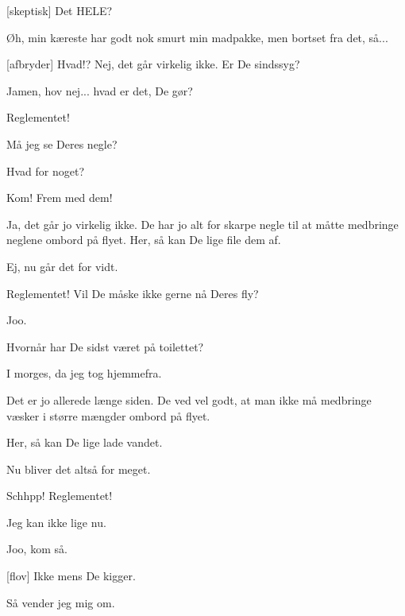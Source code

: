\documentclass[a4paper,11pt]{article}
\begin{document}
\begin{sketch}
[skeptisk] Det HELE?

 Øh, min kæreste har godt nok smurt min madpakke, men bortset fra det, så...

[afbryder] Hvad!? Nej, det går virkelig ikke. Er De sindssyg?


 Jamen, hov nej... hvad er det, De gør?

 Reglementet!


 Må jeg se Deres negle?

 Hvad for noget?

 Kom! Frem med dem!


 Ja, det går jo virkelig ikke.  De har jo alt for skarpe negle til at måtte medbringe neglene ombord på flyet.  Her, så kan De lige file dem af.

 Ej, nu går det for vidt.

 Reglementet! Vil De måske ikke gerne nå Deres fly?

 Joo.


 Hvornår har De sidst været på toilettet?

 I morges, da jeg tog hjemmefra.

 Det er jo allerede længe siden. De ved vel godt, at man ikke må medbringe væsker i større mængder ombord på flyet.


 Her, så kan De lige lade vandet.

 Nu bliver det altså for meget.

 Schhpp! Reglementet!


 Jeg kan ikke lige nu.

 Joo, kom så.

[flov] Ikke mens De kigger.

 Så vender jeg mig om.


\end{sketch}
\end{document}
